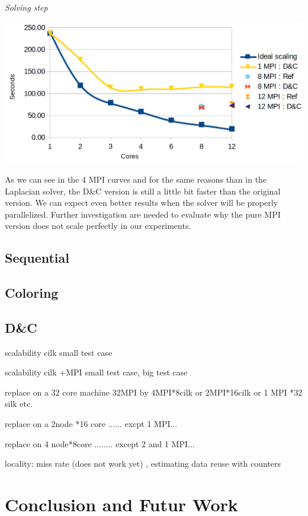 \documentclass{IOS-Book-Article}
\begin{document}
\emph{Solving step}
\begin{center}
 \includegraphics[scale=0.2]{Elasticity_solver_time.png}
\end{center}
As we can see in the 4 MPI curves and for the same reasons than in the Laplacian solver, the D\&C version is still a little bit faster than the original version.
We can expect even better results when the solver will be properly parallelized.
Further investigation are needed to evaluate why the pure MPI version does not scale perfectly in our experiments.

\subsection{Sequential}
\subsection{Coloring}
\subsection{D\&C}

scalability cilk small test case

scalability cilk +MPI small test case, big test case


replace on a 32 core machine 32MPI by 4MPI*8cilk or 2MPI*16cilk or 1 MPI *32 silk etc.

replace on a 2node *16 core   ...... excpt 1 MPI...

replace on 4 node*8core ........ except 2 and 1 MPI...


locality: miss rate (does not work yet) , estimating data reuse with counters

\section{Conclusion and Futur Work}
\end{document}
